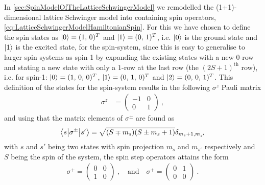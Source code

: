 \documentclass[../main.tex]{subfiles} %
\begin{document}
In \cref{sec:SpinModelOfTheLatticeSchwingerModel} we remodelled the (1+1)-dimensional lattice Schwinger model into containing spin operators, \cref{eq:LatticeSchwingerModelHamiltonianSpin}.
For this we have chosen to define the spin states as $\ket{0} = (1,\, 0)^T$ and $\ket{1} = (0,\, 1)^T$, i.e. $\ket{0}$ is the ground state and $\ket{1}$ is the excited state, for the spin-\half system, since this is easy to generalise to larger spin systems as spin-1 by expanding the existing states with a new $0$-row and stating a new state with only a $1$-row at the last row (the $(2S+1)^\mathrm{th}$ row), i.e. for spin-1: $\ket{0} = (1,\, 0,\, 0)^T$, $\ket{1} = (0,\, 1,\, 0)^T$ and $\ket{2} = (0,\, 0,\, 1)^T$. This definition of the states for the spin-\half system results in the following $\sigma^z$ Pauli matrix
\begin{align} \label{eq:PauliZOperatorSpin1/2}
    \sigma^z &= \begin{pmatrix} -1 & 0 \\ 0 & 1 \end{pmatrix} \: ,
\end{align}
and using that the matrix elements of $\sigma^\pm$ are found as \cite{sakurai_modernQM_2017}
\begin{align} \label{eq:StepSpinOperatorMatrixElements}
    \mel**{s}{\sigma^\pm}{s'} = \sqrt{(S \mp m_s)(S \pm m_s + 1)} \delta_{m_s+1,m_{s'}}
\end{align}
with $s$ and $s'$ being two states with spin projection $m_s$ and $m_{s'}$ respectively and $S$ being the spin of the system, the spin step operators attains the form
\begin{align} \label{eq:StepOperatorsSpin1/2}
    \sigma^+ = \begin{pmatrix} 0 & 0 \\ 1 & 0 \end{pmatrix} \: , \quad \text{and} \quad
    \sigma^+ = \begin{pmatrix} 0 & 1 \\ 0 & 0 \end{pmatrix} \: .
\end{align}
\end{document}
